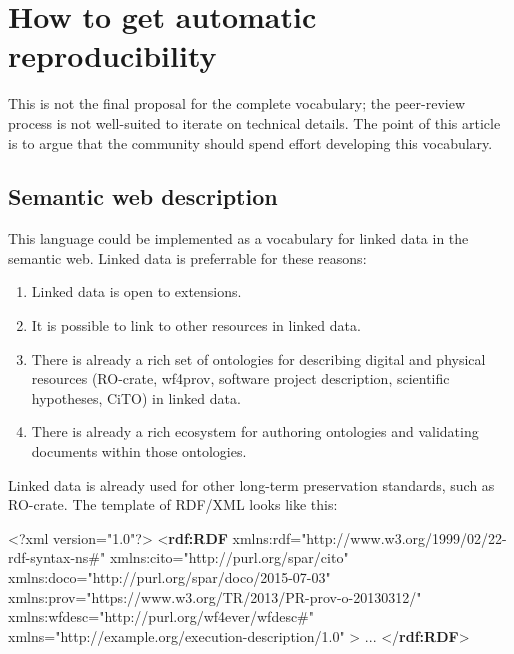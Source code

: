 \documentclass[natbib=false,manuscript,authordraft]{acmart}
\newenvironment{Shaded}{}{}
\newcommand{\FunctionTok}[1]{\textcolor[rgb]{0.02,0.16,0.49}{#1}}
\newcommand{\KeywordTok}[1]{\textcolor[rgb]{0.00,0.44,0.13}{\textbf{#1}}}
\newcommand{\NormalTok}[1]{#1}
\newcommand{\OtherTok}[1]{\textcolor[rgb]{0.00,0.44,0.13}{#1}}
\newcommand{\StringTok}[1]{\textcolor[rgb]{0.25,0.44,0.63}{#1}}
\providecommand{\tightlist}{\setlength{\itemsep}{0pt}\setlength{\parskip}{0pt}}
\begin{document}
\hypertarget{how-to-get-automatic-reproducibility}{%
\section{How to get automatic
reproducibility}\label{how-to-get-automatic-reproducibility}}

This is not the final proposal for the complete vocabulary; the
peer-review process is not well-suited to iterate on technical details.
The point of this article is to argue that the community should spend
effort developing this vocabulary.

\hypertarget{semantic-web-description}{%
\subsection{Semantic web description}\label{semantic-web-description}}

This language could be implemented as a vocabulary for linked data in
the semantic web. Linked data is preferrable for these reasons:

\begin{enumerate}
\def\labelenumi{\arabic{enumi}.}
\tightlist
\item
  Linked data is open to extensions.
\item
  It is possible to link to other resources in linked data.
\item
  There is already a rich set of ontologies for describing digital and
  physical resources (RO-crate, wf4prov, software project description,
  scientific hypotheses, CiTO) in linked data.
\item
  There is already a rich ecosystem for authoring ontologies and
  validating documents within those ontologies.
\end{enumerate}

Linked data is already used for other long-term preservation standards,
such as RO-crate. The template of RDF/XML looks like this:

\small

\begin{Shaded}
\begin{Highlighting}[]
\FunctionTok{\textless{}?xml}\OtherTok{ version=}\StringTok{"1.0"}\FunctionTok{?\textgreater{}}
\NormalTok{\textless{}}\KeywordTok{rdf:RDF}\OtherTok{ xmlns:rdf=}\StringTok{"http://www.w3.org/1999/02/22{-}rdf{-}syntax{-}ns\#"}
\OtherTok{         xmlns:cito=}\StringTok{"http://purl.org/spar/cito"}
\OtherTok{         xmlns:doco=}\StringTok{"http://purl.org/spar/doco/2015{-}07{-}03"}
\OtherTok{         xmlns:prov=}\StringTok{"https://www.w3.org/TR/2013/PR{-}prov{-}o{-}20130312/"}
\OtherTok{         xmlns:wfdesc=}\StringTok{"http://purl.org/wf4ever/wfdesc\#"}
\OtherTok{         xmlns=}\StringTok{"http://example.org/execution{-}description/1.0"}\NormalTok{ \textgreater{}}
\NormalTok{...}
\NormalTok{\textless{}/}\KeywordTok{rdf:RDF}\NormalTok{\textgreater{}}
\end{Highlighting}
\end{Shaded}
\end{document}
